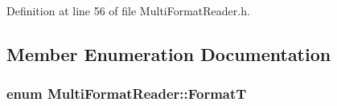 Definition at line 56 of file Multi\+Format\+Reader.\+h.



\subsection{Member Enumeration Documentation}
\subsubsection[{\texorpdfstring{FormatT}{FormatT}}]{\setlength{\rightskip}{0pt plus 5cm}enum {\bf Multi\+Format\+Reader\+::\+FormatT}}\hypertarget{class_multi_format_reader_a6669d0a4e5bb7b72224b6769fea22566}{}\label{class_multi_format_reader_a6669d0a4e5bb7b72224b6769fea22566}
